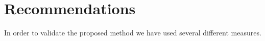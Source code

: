 \section{Recommendations}\label{sec:recommendations}
In order to validate the proposed method we have used several different measures.



